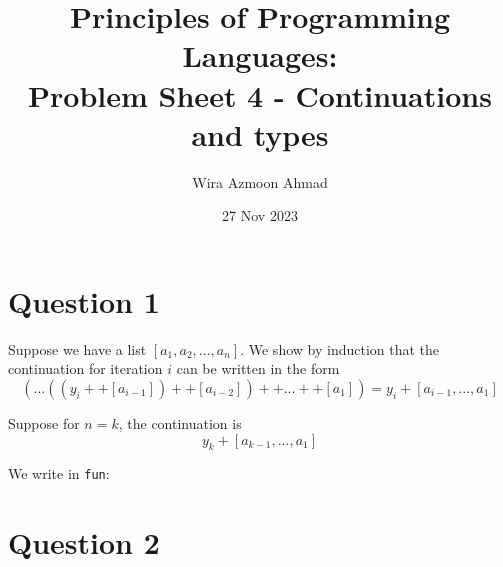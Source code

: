 \documentclass[11pt]{article} %
\title{Principles of Programming Languages: \\Problem Sheet 4 - Continuations and types}
\author{Wira Azmoon Ahmad}
\date{27 Nov 2023}
\begin{document}
%
\maketitle




\section*{Question 1}




Suppose we have a list $[a_1,a_2,...,a_n]$.
We show by induction that the continuation for iteration $i$ can be written in the form
\[(...((y_i ++ [a_{i-1}]) ++ [a_{i-2}])++...++[a_1]) = y_i + [a_{i-1},...,a_1] \]



Suppose for $n=k$, the continuation is 
\[y_k + [a_{k-1},...,a_1] \]



We write in \texttt{fun}:


\section*{Question 2}


\end{document}
